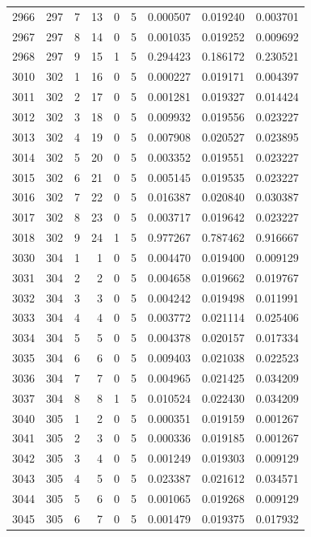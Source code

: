 \begin{longtable}{rrrrrrrrr}
2966 & 297 & 7 & 13 & 0 & 5 & 0.000507 & 0.019240 & 0.003701 \\
2967 & 297 & 8 & 14 & 0 & 5 & 0.001035 & 0.019252 & 0.009692 \\
2968 & 297 & 9 & 15 & 1 & 5 & 0.294423 & 0.186172 & 0.230521 \\
3010 & 302 & 1 & 16 & 0 & 5 & 0.000227 & 0.019171 & 0.004397 \\
3011 & 302 & 2 & 17 & 0 & 5 & 0.001281 & 0.019327 & 0.014424 \\
3012 & 302 & 3 & 18 & 0 & 5 & 0.009932 & 0.019556 & 0.023227 \\
3013 & 302 & 4 & 19 & 0 & 5 & 0.007908 & 0.020527 & 0.023895 \\
3014 & 302 & 5 & 20 & 0 & 5 & 0.003352 & 0.019551 & 0.023227 \\
3015 & 302 & 6 & 21 & 0 & 5 & 0.005145 & 0.019535 & 0.023227 \\
3016 & 302 & 7 & 22 & 0 & 5 & 0.016387 & 0.020840 & 0.030387 \\
3017 & 302 & 8 & 23 & 0 & 5 & 0.003717 & 0.019642 & 0.023227 \\
3018 & 302 & 9 & 24 & 1 & 5 & 0.977267 & 0.787462 & 0.916667 \\
3030 & 304 & 1 & 1 & 0 & 5 & 0.004470 & 0.019400 & 0.009129 \\
3031 & 304 & 2 & 2 & 0 & 5 & 0.004658 & 0.019662 & 0.019767 \\
3032 & 304 & 3 & 3 & 0 & 5 & 0.004242 & 0.019498 & 0.011991 \\
3033 & 304 & 4 & 4 & 0 & 5 & 0.003772 & 0.021114 & 0.025406 \\
3034 & 304 & 5 & 5 & 0 & 5 & 0.004378 & 0.020157 & 0.017334 \\
3035 & 304 & 6 & 6 & 0 & 5 & 0.009403 & 0.021038 & 0.022523 \\
3036 & 304 & 7 & 7 & 0 & 5 & 0.004965 & 0.021425 & 0.034209 \\
3037 & 304 & 8 & 8 & 1 & 5 & 0.010524 & 0.022430 & 0.034209 \\
3040 & 305 & 1 & 2 & 0 & 5 & 0.000351 & 0.019159 & 0.001267 \\
3041 & 305 & 2 & 3 & 0 & 5 & 0.000336 & 0.019185 & 0.001267 \\
3042 & 305 & 3 & 4 & 0 & 5 & 0.001249 & 0.019303 & 0.009129 \\
3043 & 305 & 4 & 5 & 0 & 5 & 0.023387 & 0.021612 & 0.034571 \\
3044 & 305 & 5 & 6 & 0 & 5 & 0.001065 & 0.019268 & 0.009129 \\
3045 & 305 & 6 & 7 & 0 & 5 & 0.001479 & 0.019375 & 0.017932 \\

\end{longtable}
